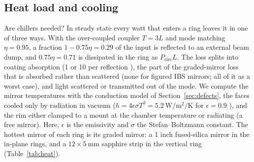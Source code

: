 \documentclass[11pt]{article}
\begin{document}
\subsection{Heat load and cooling}
\label{sec:heat}

Are chillers needed? In steady state every watt that enters a ring leaves it in one of three ways. With the
over-coupled coupler $T = 3L$ and mode matching $\eta = 0.95$, a fraction $1 - 0.75\eta = 0.29$ of the input
is reflected to an external beam dump, and $0.75\eta = 0.71$ is dissipated in the ring as $P_\mathrm{circ}L$.
The loss splits into coating absorption (1 or \SI{10}{\ppm} per reflection \placeholder{[VALUE?]}), the part of
the graded-mirror loss that is absorbed rather than scattered (none for figured IBS mirrors; all of it as a
worst case), and light scattered or transmitted out of the mode. We compute the mirror temperatures with the
conduction model of Section~\ref{sec:defects}, the faces cooled only by radiation in vacuum
($h = 4\epsilon\sigma T^{3} = \SI{5.2}{\watt\per\metre\squared\per\kelvin}$ for $\epsilon = 0.9$
\placeholder{[VALUE?]}), and the rim either clamped to a mount at the chamber temperature or radiating (a free
mirror). Here, $\epsilon$ is the emissivity and $\sigma$ the Stefan--Boltzmann constant. The hottest mirror of each
ring is its graded mirror: a 1 inch fused-silica mirror in the in-plane rings, and a $12\times\SI{5}{\milli\metre}$
sapphire strip in the vertical ring (Table~\ref{tab:heat}).
\end{document}
